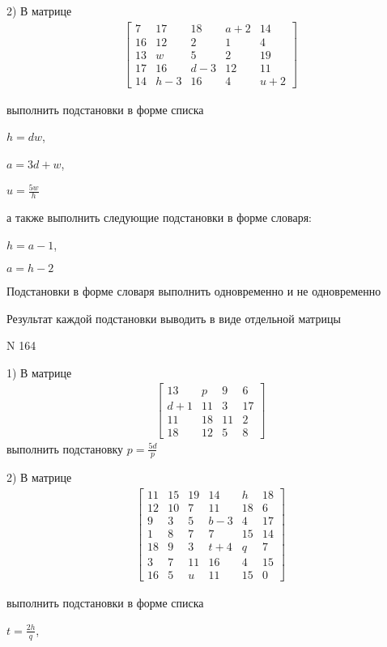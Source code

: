 \documentclass[11pt]{report}
\begin{document}
    2) В матрице
\begin{align*}
\left[\begin{matrix}7 & 17 & 18 & a + 2 & 14\\16 & 12 & 2 & 1 & 4\\13 & w & 5 & 2 & 19\\17 & 16 & d - 3 & 12 & 11\\14 & h - 3 & 16 & 4 & u + 2\end{matrix}\right]
\end{align*}

выполнить подстановки в форме списка

$h=d w$,

$a=3 d + w$,

$u=\frac{5 w}{h}$

а также выполнить следующие подстановки в форме словаря:

$h=a - 1$,

$a=h - 2$


    Подстановки в форме словаря выполнить одновременно и не одновременно


    Результат каждой подстановки выводить в виде отдельной матрицы

\newpage
N 164


    1) В матрице
\begin{align*}
\left[\begin{matrix}13 & p & 9 & 6\\d + 1 & 11 & 3 & 17\\11 & 18 & 11 & 2\\18 & 12 & 5 & 8\end{matrix}\right]
\end{align*}
выполнить подстановку $p=\frac{5 d}{p}$


    2) В матрице
\begin{align*}
\left[\begin{matrix}11 & 15 & 19 & 14 & h & 18\\12 & 10 & 7 & 11 & 18 & 6\\9 & 3 & 5 & b - 3 & 4 & 17\\1 & 8 & 7 & 7 & 15 & 14\\18 & 9 & 3 & t + 4 & q & 7\\3 & 7 & 11 & 16 & 4 & 15\\16 & 5 & u & 11 & 15 & 0\end{matrix}\right]
\end{align*}

выполнить подстановки в форме списка

$t=\frac{2 h}{q}$,
\end{document}
